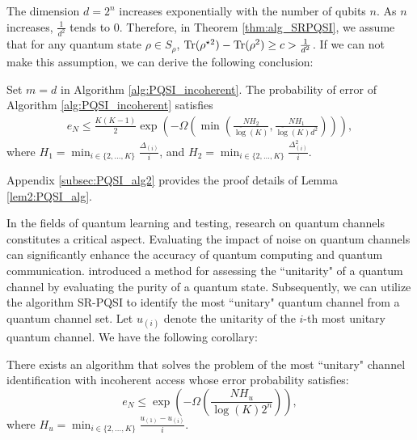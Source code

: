 The dimension $d=2^n$ increases exponentially with the number of qubits $n$. As $n$ increases, $\frac{1}{d^2}$ tends to 0. Therefore, in Theorem \ref{thm:alg_SRPQSI}, we assume that for any quantum state $\rho \in S_\rho$, $\mathrm{Tr}(\rho^{\star2}) - \mathrm{Tr}(\rho^{2}) \geq c > \frac{1}{d^2}$. If we can not make this assumption, we can derive the following conclusion:

\begin{lemma}
    \label{lem2:PQSI_alg}
    Set $m=d$ in Algorithm \ref{alg:PQSI_incoherent}. The probability of error of Algorithm \ref{alg:PQSI_incoherent} satisfies
    \begin{equation*}
    \begin{aligned}
        e_N \leq \frac{K(K-1)}{2} \exp\left(- \Omega\left(\min\left(\frac{N H_2}{\overline{\log}(K)}, \frac{N H_1}{\overline{\log}(K)d^2}\right)\right) \right),
    \end{aligned}
    \end{equation*}
    where $H_1 = \min_{i \in \{2,...,K\}} \frac{\Delta_{(i)}}{i}$, and $H_2 = \min_{i \in \{2,...,K\}} \frac{\Delta^2_{(i)}}{i}$.
\end{lemma}

Appendix \ref{subsec:PQSI_alg2} provides the proof details of Lemma \ref{lem2:PQSI_alg}.

In the fields of quantum learning and testing, research on quantum channels constitutes a critical aspect. Evaluating the impact of noise on quantum channels can significantly enhance the accuracy of quantum computing and quantum communication. \cite{chen2023unitarity} introduced a method for assessing the ``unitarity" of a quantum channel by evaluating the purity of a quantum state. Subsequently, we can utilize the algorithm SR-PQSI to identify the most ``unitary" quantum channel from a quantum channel set. Let $u_{(i)}$ denote the unitarity of the $i$-th most unitary quantum channel. We have the following corollary:

\begin{corollary}
    There exists an algorithm that solves the problem of the most ``unitary" channel identification with incoherent access whose error probability satisfies:
 \begin{equation}
        e_N \leq \exp\left(- \Omega\left(\frac{N H_u}{\log(K) 2^n }\right) \right),
    \end{equation}
    where $H_u = \min_{i \in \{2,...,K\}} \frac{u_{(1)} - u_{(i)}}{i}$.
\end{corollary}